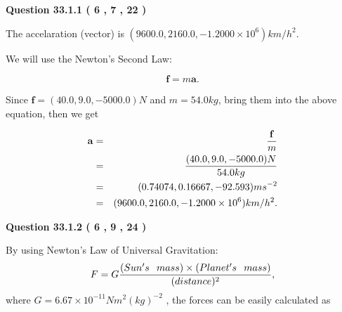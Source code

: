 \documentclass[12pt]{article}
\begin{document}
{\textbf{\Large{Question
33.1.1 
 (           6 ,           7 ,          22 )
}}}
  
  
 
 
\noindent{}
 
 
The accelaration (vector) is
$(
9600.0,
2160.0 ,
-1.2000 \times 10^{6}
)km/h^2.
$
 
 
 
 
 
 
\noindent{}

We will use the Newton's Second Law:
 
\[
\mathbf{f}=m\mathbf{a}.
\]
 
Since $\mathbf{f}=( %
40.0,  %
9.0,  %
-5000.0 )N$
and $m= %
54.0 kg$, bring them into the above equation, then we get
 
\begin{eqnarray*}
\mathbf{a}&=&\frac{\mathbf{f}}m  \\
&=&\frac{(
40.0 ,
9.0 ,
-5000.0 )N
}{ %
54.0 kg}  \\
&=&(
0.74074 ,
0.16667,
-92.593
)ms^{-2} \\
&=&(
9600.0 ,
2160.0 ,
-1.2000 \times 10^{6}
)km/h^2.
\end{eqnarray*}
 
 
 
  
\vspace{0.2in}
  
{\textbf{\Large{Question
33.1.2 
 (           6 ,           9 ,          24 )
}}}
  
  
 
 
\noindent{}

By using Newton's Law of Universal Gravitation:
\[
F=G \frac{(Sun's \hspace{0.1in} mass) \times (Planet's \hspace{0.1in} mass)} { (distance)^2},
\]
where
$ G= %
6.67 \times 10^{-11}N m^{2}(kg)^{-2}$ , the forces can be easily calculated as
 
\vspace{0.2in}
 
\end{document}
